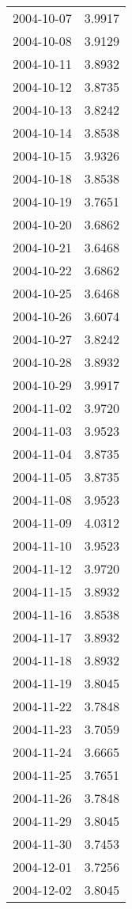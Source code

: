 \begin{tabular}{lr}
2004-10-07 &      3.9917 \\
2004-10-08 &      3.9129 \\
2004-10-11 &      3.8932 \\
2004-10-12 &      3.8735 \\
2004-10-13 &      3.8242 \\
2004-10-14 &      3.8538 \\
2004-10-15 &      3.9326 \\
2004-10-18 &      3.8538 \\
2004-10-19 &      3.7651 \\
2004-10-20 &      3.6862 \\
2004-10-21 &      3.6468 \\
2004-10-22 &      3.6862 \\
2004-10-25 &      3.6468 \\
2004-10-26 &      3.6074 \\
2004-10-27 &      3.8242 \\
2004-10-28 &      3.8932 \\
2004-10-29 &      3.9917 \\
2004-11-02 &      3.9720 \\
2004-11-03 &      3.9523 \\
2004-11-04 &      3.8735 \\
2004-11-05 &      3.8735 \\
2004-11-08 &      3.9523 \\
2004-11-09 &      4.0312 \\
2004-11-10 &      3.9523 \\
2004-11-12 &      3.9720 \\
2004-11-15 &      3.8932 \\
2004-11-16 &      3.8538 \\
2004-11-17 &      3.8932 \\
2004-11-18 &      3.8932 \\
2004-11-19 &      3.8045 \\
2004-11-22 &      3.7848 \\
2004-11-23 &      3.7059 \\
2004-11-24 &      3.6665 \\
2004-11-25 &      3.7651 \\
2004-11-26 &      3.7848 \\
2004-11-29 &      3.8045 \\
2004-11-30 &      3.7453 \\
2004-12-01 &      3.7256 \\
2004-12-02 &      3.8045 \\

\end{tabular}
